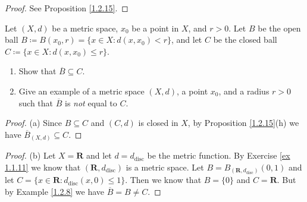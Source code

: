 \begin{proof}
    See Proposition \ref{1.2.15}.
\end{proof}

\begin{exercise}\label{ex 1.2.4}
    Let \((X, d)\) be a metric space, \(x_0\) be a point in \(X\), and \(r > 0\).
    Let \(B\) be the open ball \(B \coloneqq B(x_0, r) = \{x \in X : d(x, x_0) < r\}\), and let \(C\) be the closed ball \(C \coloneqq \{x \in X : d(x, x_0) \leq r\}\).
    \begin{enumerate}
        \item Show that \(\overline{B} \subseteq C\).
        \item Give an example of a metric space \((X, d)\), a point \(x_0\), and a radius \(r > 0\) such that \(\overline{B}\) is \emph{not} equal to \(C\).
    \end{enumerate}
\end{exercise}

\begin{proof}{(a)}
    Since \(B \subseteq C\) and \((C, d)\) is closed in \(X\), by Proposition \ref{1.2.15}(h) we have \(\overline{B}_{(X, d)} \subseteq C\).
\end{proof}

\begin{proof}{(b)}
    Let \(X = \mathbf{R}\) and let \(d = d_{\text{disc}}\) be the metric function.
    By Exercise \ref{ex 1.1.11} we know that \((\mathbf{R}, d_{\text{disc}})\) is a metric space.
    Let \(B = B_{(\mathbf{R}, d_{\text{disc}})}(0, 1)\) and let \(C = \{x \in \mathbf{R} : d_{\text{disc}}(x, 0) \leq 1\}\).
    Then we know that \(B = \{0\}\) and \(C = \mathbf{R}\).
    But by Example \ref{1.2.8} we have \(\overline{B} = B \neq C\).
\end{proof}